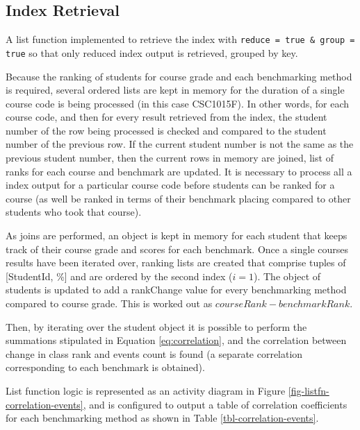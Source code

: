 \subsection{Index Retrieval}
A list function implemented to retrieve the index with \texttt{reduce = true \& group = true} so that only reduced index output is retrieved, grouped by key.

Because the ranking of students for course grade and each benchmarking method is required, several ordered lists are kept in memory for the duration of a single course code is being processed (in this case CSC1015F). In other words, for each course code, and then for every result retrieved from the index, the student number of the row being processed is checked and compared to the student number of the previous row. If the current student number is not the same as the previous student number, then the current rows in memory are joined, list of ranks for each course and benchmark are updated. It is necessary to process all a index output for a particular course code before students can be ranked for a course (as well be ranked in terms of their benchmark placing compared to other students who took that course).

As joins are performed, an object is kept in memory for each student that keeps track of their course grade and scores for each benchmark. Once a single courses results have been iterated over, ranking lists are created that comprise tuples of [StudentId, \%] and are ordered by the second index ($i = 1$). The object of students is updated to add a rankChange value for every benchmarking method compared to course grade. This is worked out as $courseRank - benchmarkRank$.

Then, by iterating over the student object it is possible to perform the summations stipulated in Equation \ref{eq:correlation}, and the correlation between change in class rank and events count is found (a separate correlation corresponding to each benchmark is obtained).

List function logic is represented as an activity diagram in Figure \ref{fig-listfn-correlation-events}, and is configured to output a table of correlation coefficients for each benchmarking method as shown in Table \ref{tbl-correlation-events}.

